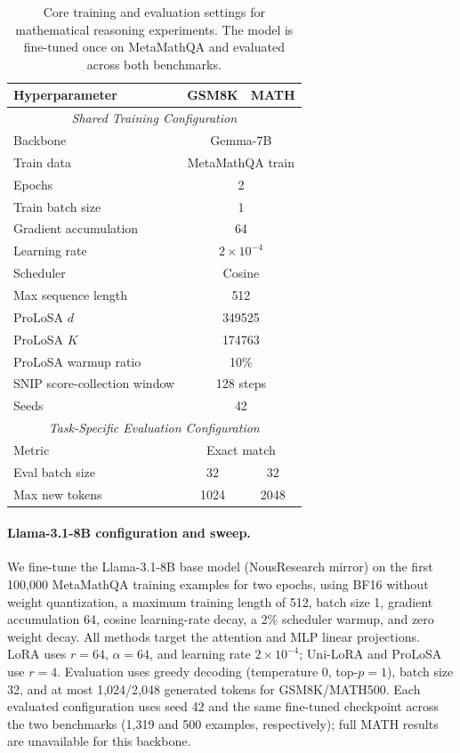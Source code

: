 \begin{table}[htbp]
\centering
\small
\setlength{\tabcolsep}{6pt}
\begin{tabular}{lcc}
\toprule
\textbf{Hyperparameter} & \textbf{GSM8K} & \textbf{MATH} \\
\midrule
\multicolumn{3}{c}{\textit{Shared Training Configuration}} \\
\midrule
Backbone & \multicolumn{2}{c}{Gemma-7B} \\
Train data & \multicolumn{2}{c}{MetaMathQA train} \\
Epochs & \multicolumn{2}{c}{2} \\
Train batch size & \multicolumn{2}{c}{1} \\
Gradient accumulation & \multicolumn{2}{c}{64} \\
Learning rate & \multicolumn{2}{c}{$2\times10^{-4}$} \\
Scheduler & \multicolumn{2}{c}{Cosine} \\
Max sequence length & \multicolumn{2}{c}{512} \\
ProLoSA $d$ & \multicolumn{2}{c}{349525} \\
ProLoSA $K$ & \multicolumn{2}{c}{174763} \\
ProLoSA warmup ratio & \multicolumn{2}{c}{10\%} \\
SNIP score-collection window & \multicolumn{2}{c}{128 steps}\\
Seeds & \multicolumn{2}{c}{42} \\
\midrule
\multicolumn{3}{c}{\textit{Task-Specific Evaluation Configuration}} \\
\midrule
Metric & \multicolumn{2}{c}{Exact match} \\
Eval batch size & 32 & 32 \\
Max new tokens & 1024 & 2048 \\
\bottomrule
\end{tabular}
\caption{Core training and evaluation settings for mathematical reasoning experiments. The model is fine-tuned once on MetaMathQA and evaluated across both benchmarks.}
\label{tab:math_hyperparams}
\end{table}


\paragraph{Llama-3.1-8B configuration and sweep.}
\label{app:llama31_math_sweep}
We fine-tune the Llama-3.1-8B base model (NousResearch mirror) on the first 100,000 MetaMathQA training examples for two epochs, using BF16 without weight quantization, a maximum training length of 512, batch size 1, gradient accumulation 64, cosine learning-rate decay, a 2\% scheduler warmup, and zero weight decay. All methods target the attention and MLP linear projections. LoRA uses $r=64$, $\alpha=64$, and learning rate $2\times10^{-4}$; Uni-LoRA and ProLoSA use $r=4$. Evaluation uses greedy decoding (temperature 0, top-$p=1$), batch size 32, and at most 1,024/2,048 generated tokens for GSM8K/MATH500. Each evaluated configuration uses seed 42 and the same fine-tuned checkpoint across the two benchmarks (1,319 and 500 examples, respectively); full MATH results are unavailable for this backbone.

